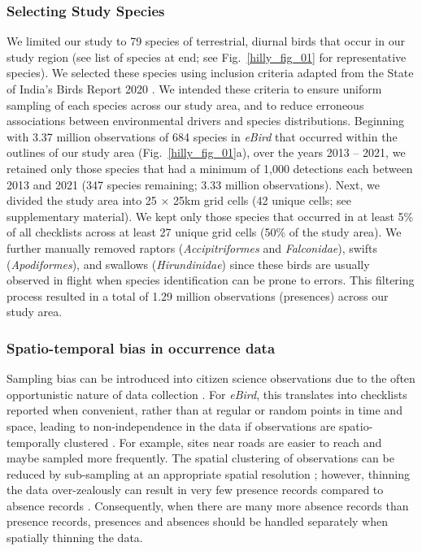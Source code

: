 \subsubsection*{Selecting Study Species}

We limited our study to 79 species of terrestrial, diurnal birds that occur in our study region (see list of species at end; see Fig.~\ref{hilly_fig_01} for representative species).
We selected these species using inclusion criteria adapted from the State of India's Birds Report 2020 \citep[SoIB][]{viswanathan2020}.
We intended these criteria to ensure uniform sampling of each species across our study area, and to reduce erroneous associations between environmental drivers and species distributions.
Beginning with 3.37 million observations of 684 species in \textit{eBird} that occurred within the outlines of our study area (Fig.~\ref{hilly_fig_01}a), over the years 2013 -- 2021, we retained only those species that had a minimum of 1,000 detections each between 2013 and 2021 (347 species remaining; 3.33 million observations).
Next, we divided the study area into 25 $\times$ 25km grid cells (42 unique cells; see supplementary material).
We kept only those species that occurred in at least 5\% of all checklists across at least 27 unique grid cells (50\% of the study area).
We further manually removed raptors (\textit{Accipitriformes} and \textit{Falconidae}), swifts (\textit{Apodiformes}), and swallows (\textit{Hirundinidae}) since these birds are usually observed in flight when species identification can be prone to errors.
This filtering process resulted in a total of 1.29 million observations (presences) across our study area.

\subsubsection*{Spatio-temporal bias in occurrence data}

Sampling bias can be introduced into citizen science observations due to the often opportunistic nature of data collection \citep{sullivan2014}.
For \textit{eBird}, this translates into checklists reported when convenient, rather than at regular or random points in time and space, leading to non-independence in the data if observations are spatio-temporally clustered \citep{johnston2021}.
For example, sites near roads are easier to reach and maybe sampled more frequently.
The spatial clustering of observations can be reduced by sub-sampling at an appropriate spatial resolution \citep{aiello-lammens2015}; however, thinning the data over-zealously can result in very few presence records compared to absence records \citep[i.e., class imbalance][]{steen2019}.
Consequently, when there are many more absence records than presence records, presences and absences should be handled separately when spatially thinning the data.

